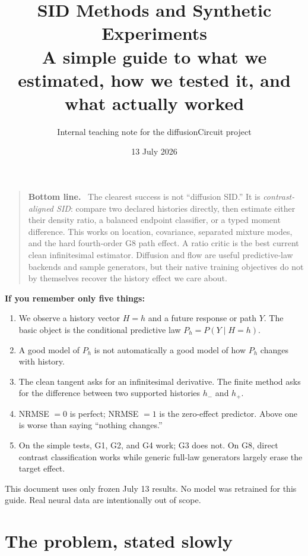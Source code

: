 \documentclass[11pt]{article}
\title{\vspace{-1.25cm}\textbf{SID Methods and Synthetic Experiments}\\[4pt]
\large A simple guide to what we estimated, how we tested it, and what actually worked}
\author{Internal teaching note for the diffusionCircuit project}
\date{13 July 2026}
\newenvironment{bottomline}
  {\begin{quote}\color{sidblue}\textbf{Bottom line.}\ }
  {\end{quote}}
\begin{document}
\maketitle

\begin{bottomline}
The clearest success is not ``diffusion SID.''  It is \emph{contrast-aligned SID}:
compare two declared histories directly, then estimate either their density ratio,
a balanced endpoint classifier, or a typed moment difference.  This works on
location, covariance, separated mixture modes, and the hard fourth-order G8 path
effect.  A ratio critic is the best current clean infinitesimal estimator.  Diffusion
and flow are useful predictive-law backends and sample generators, but their native
training objectives do not by themselves recover the history effect we care about.
\end{bottomline}

\textbf{If you remember only five things:}
\begin{enumerate}
  \item We observe a history vector $H=h$ and a future response or path $Y$.  The
        basic object is the conditional predictive law $P_h=P(Y\mid H=h)$.
  \item A good model of $P_h$ is not automatically a good model of how $P_h$
        changes with history.
  \item The clean tangent asks for an infinitesimal derivative.  The finite method
        asks for the difference between two supported histories $h_-$ and $h_+$.
  \item NRMSE $=0$ is perfect; NRMSE $=1$ is the zero-effect predictor.  Above one
        is worse than saying ``nothing changes.''
  \item On the simple tests, G1, G2, and G4 work; G3 does not.  On G8, direct
        contrast classification works while generic full-law generators largely
        erase the target effect.
\end{enumerate}

\vfill
\begin{center}
\small\color{sidgray}
This document uses only frozen July 13 results.  No model was retrained for this guide.
Real neural data are intentionally out of scope.
\end{center}
\newpage

\section{The problem, stated slowly}
\end{document}
